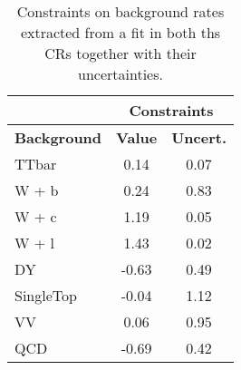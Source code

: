 \documentclass[10pt]{article}
\begin{document}
\begin{table}[!ht]
\begin{center}
\begin{tabular}{|l|c|c|}
\hline
\hline
& \multicolumn{2}{c|}{\textbf{Constraints}} \\
\hline
\hline
\textbf{Background} & \textbf{ Value} & \textbf{Uncert.} \\
\hline
TTbar            & 0.14  & 0.07    \\
W + b            & 0.24  & 0.83    \\
W + c            & 1.19  & 0.05    \\
W + l            & 1.43  & 0.02    \\
DY               & -0.63 & 0.49    \\
SingleTop        & -0.04 & 1.12    \\
VV               & 0.06  & 0.95    \\
QCD              & -0.69 & 0.42    \\
\hline
\hline

\hline
\hline
\end{tabular}
\caption{Constraints on background rates extracted from a fit in both ths CRs together with their uncertainties.}
\label{tab:SFtable}
\end{center}
\end{table} 
\end{document}
